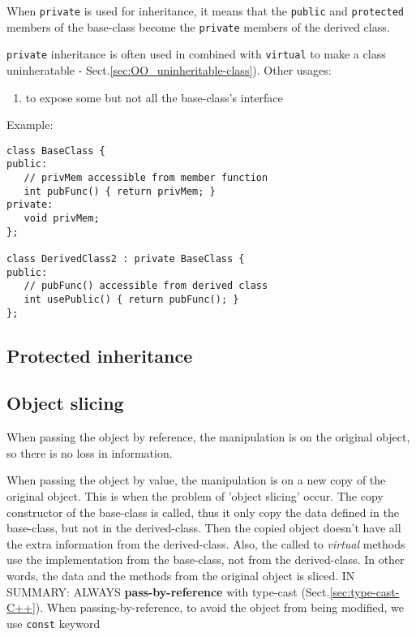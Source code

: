 When \verb!private! is used for inheritance, it means that the \verb!public!
and \verb!protected! members of the base-class become the \verb!private! members
of the derived class.

\verb!private! inheritance is often used in combined with \verb!virtual! to
make a class uninheratable - Sect.\ref{sec:OO_uninheritable-class}). Other
usages:
\begin{enumerate}
  \item to expose some but not all the base-class's interface
\end{enumerate}

Example:
\begin{Verbatim}
class BaseClass {
public:
   // privMem accessible from member function
   int pubFunc() { return privMem; }
private:
   void privMem;
};

class DerivedClass2 : private BaseClass {
public:
   // pubFunc() accessible from derived class
   int usePublic() { return pubFunc(); }
};
\end{Verbatim}


\subsection{Protected inheritance}
\label{sec:inheritance_protected}


\subsection{Object slicing}
\label{sec:object-slicing}


When passing the object by reference, the manipulation is on the original
object, so there is no loss in information. 

When passing the object by value, the manipulation is on a new copy of the
original object. This is when the problem of 'object slicing' occur. The copy
constructor of the base-class is called, thus it only copy the data defined in
the base-class, but not in the derived-class. Then the copied object doesn't
have all the extra information from the derived-class. Also, the called to {\it
virtual} methods use the implementation from the base-class, not from the
derived-class. In other words, the data and the methods from the original object
is sliced. IN SUMMARY:
ALWAYS {\bf pass-by-reference} with type-cast (Sect.\ref{sec:type-cast-C++}).
When passing-by-reference, to avoid the object from being modified, we use
\verb!const! keyword

